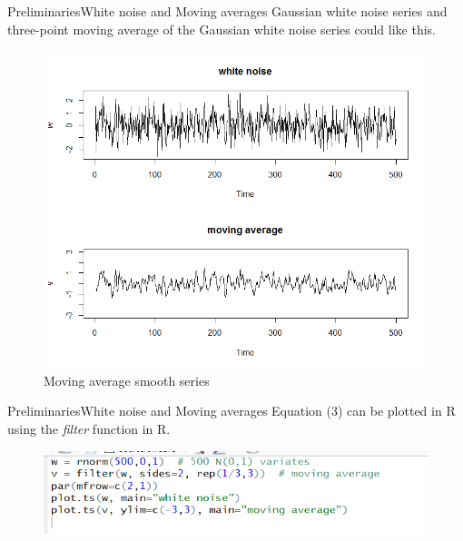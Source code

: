 \documentclass{beamer}
\begin{document}
\begin{frame}{Preliminaries}{White noise and Moving averages}
\small {Gaussian white noise series and three-point moving average of the Gaussian white noise series could like this. }

\begin{figure}
	\centering
	\includegraphics[width=0.75\linewidth]{Whitenoise_ma}
	\caption{Moving average smooth series}
	\label{}
\end{figure}

\end{frame}


\begin{frame}{Preliminaries}{White noise and Moving averages}
Equation (3) can be plotted in R using the \textit{filter} function in R. 

\begin{figure}
\centering
\includegraphics[width=\linewidth]{whitenoise_rcode}
\end{figure}


\end{frame}
\end{document}
